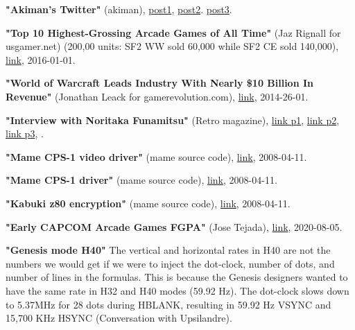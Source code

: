 \begin{thebibliography}{999}
  \textbf{ "Akiman's Twitter"} (akiman),
  \href{https://twitter.com/akiman7/status/465507673572519936}{post1},
  \href{https://twitter.com/akiman7/status/309615270815731712}{post2}.
  \href{https://twitter.com/akiman7/status/386598518380453888}{post3}.

  \textbf{ "Top 10 Highest-Grossing Arcade Games of All Time"} (Jaz Rignall for usgamer.net) (200,00 units: SF2 WW sold 60,000 while SF2 CE sold 140,000),
  \href{https://www.usgamer.net/articles/top-10-biggest-grossing-arcade-games-of-all-time}{link},
  2016-01-01.

  \textbf{ "World of Warcraft Leads Industry With Nearly \$10 Billion In Revenue"} (Jonathan Leack for gamerevolution.com),
  \href{https://www.gamerevolution.com/features/13510-world-of-warcraft-leads-industry-with-nearly-10-billion-in-revenue#/slide/1}{link},
  2014-26-01.
  
  \textbf{"Interview with Noritaka Funamitsu"} (Retro magazine),
  \href{http://fightingstreet.com/folders/variousinfofolder/interviewfolder/sfii_funamitsu/funamitsu1.jpg}{link p1},
  \href{http://fightingstreet.com/folders/variousinfofolder/interviewfolder/sfii_funamitsu/funamitsu2.jpg}{link p2},
  \href{http://fightingstreet.com/folders/variousinfofolder/interviewfolder/sfii_funamitsu/funamitsu3.jpg}{link p3},
  .

  \textbf{"Mame CPS-1 video driver"} (mame source code),
  \href{https://github.com/mamedev/mame/blob/e070405df99e6a5997d5a64ecd62e7161c729a9d/src/mame/video/cps1.cpp#L269}{link},
  2008-04-11.

  \textbf{"Mame CPS-1 driver"} (mame source code),
  \href{https://github.com/mamedev/mame/blob/e070405df99e6a5997d5a64ecd62e7161c729a9d/src/mame/drivers/cps1.cpp#L567}{link},
  2008-04-11.

  \textbf{"Kabuki z80 encryption"} (mame source code),
  \href{https://github.com/mamedev/historic-mame/blob/master/src/mame/machine/kabuki.c}{link},
  2008-04-11.


  \textbf{"Early CAPCOM Arcade Games FGPA"} (Jose Tejada),
  \href{https://github.com/jotego/jt_gng/blob/fb92e5ac0f72323638974034ad652649b6efafcb/README.md}{link},
  2020-08-05.

  \textbf{"Genesis mode H40"}
  The vertical and horizontal rates in H40 are not the numbers we would get if we were to inject the dot-clock, number of dots, and number of lines in the formulas. This is because the Genesis designers wanted to have the same rate in H32 and H40 modes (59.92 Hz). The dot-clock slows down to 5.37MHz for 28 dots during HBLANK, resulting in 59.92 Hz VSYNC and 15,700 KHz HSYNC (Conversation with Upsilandre).


\end{thebibliography}
